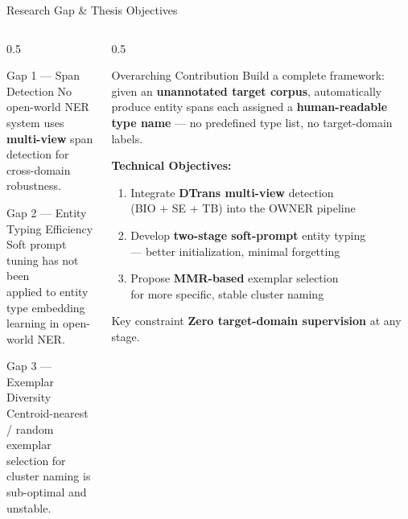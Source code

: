 \documentclass[aspectratio=169,10pt]{beamer}
\begin{document}
\begin{frame}{Research Gap \& Thesis Objectives}
  \begin{columns}[T]
    \begin{column}{0.5\textwidth}
      \begin{alertblock}{Gap 1 — Span Detection}
        No open-world NER system uses\\
        \textbf{multi-view} span detection for\\
        cross-domain robustness.
      \end{alertblock}
      \vspace{0.3em}
      \begin{alertblock}{Gap 2 — Entity Typing Efficiency}
        Soft prompt tuning has not been\\
        applied to entity type embedding\\
        learning in open-world NER.
      \end{alertblock}
      \vspace{0.3em}
      \begin{alertblock}{Gap 3 — Exemplar Diversity}
        Centroid-nearest / random exemplar\\
        selection for cluster naming is\\
        sub-optimal and unstable.
      \end{alertblock}
    \end{column}
    \begin{column}{0.5\textwidth}
      \begin{exampleblock}{Overarching Contribution}
        \small
        Build a complete framework: given an \textbf{unannotated target corpus}, automatically produce entity spans each assigned a \textbf{human-readable type name} — no predefined type list, no target-domain labels.
      \end{exampleblock}
      \vspace{0.3em}
      \textbf{Technical Objectives:}
      \begin{enumerate}
        \setlength{\itemsep}{0.3em}
        \small
        \item Integrate \textbf{DTrans multi-view} detection\\(BIO + SE + TB) into the OWNER pipeline
        \item Develop \textbf{two-stage soft-prompt} entity typing\\— better initialization, minimal forgetting
        \item Propose \textbf{MMR-based} exemplar selection\\for more specific, stable cluster naming
      \end{enumerate}
      \vspace{0.3em}
      \begin{block}{Key constraint}
        \textbf{Zero target-domain supervision} at any stage.
      \end{block}
    \end{column}
  \end{columns}
\end{frame}
\end{document}
